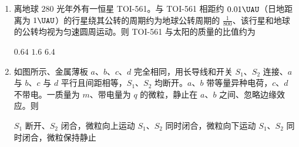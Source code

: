 \documentclass[\gkver]{gaokaozhenti}
\begin{document}
\begin{enumerate}
{管内机械波的振幅为 $1 \Ucm$}
{管内机械波的波长为 $1 \Ucm$}
{每秒有 $10$ 个完整的波经过位置 $c$}

\item
离地球 $280$ 光年外有一恒星 TOI-561。与 TOI-561 相距约 $0.01\UAU$（日地距离为 $1\UAU$）的行星绕其公转的周期约为地球公转周期的 $\frac{1}{800}$、该行星和地球的公转均视为匀速圆周运动。则 TOI-561 与太阳的质量的比值约为 

{$0.64$}
{$1.6$}
{$6.4$}

\item
如图所示、金属薄板 $a$、$b$、$c$、$d$ 完全相同，用长导线和开关 $S_{1}$、$S_{2}$ 连接、$a$ 与 $b$、$c$ 与 $d$ 平行且间距相等，$S_{1}$、$S_{2}$ 均断开。$a$、$b$ 带等量异种电荷，$c$、$d$ 不带电。一质量为 $m$、带电量为 $q$ 的微粒，静止在 $a$、$b$ 之间、忽略边缘效应。则 

{$S_{1}$ 断开、$S_{2}$ 闭合，微粒向上运动}
{$S_{1}$、$S_{2}$ 同时闭合，微粒向下运动}
{$S_{1}$、$S_{2}$ 同时闭合，微粒保持静止}


\end{enumerate}
\end{document}
